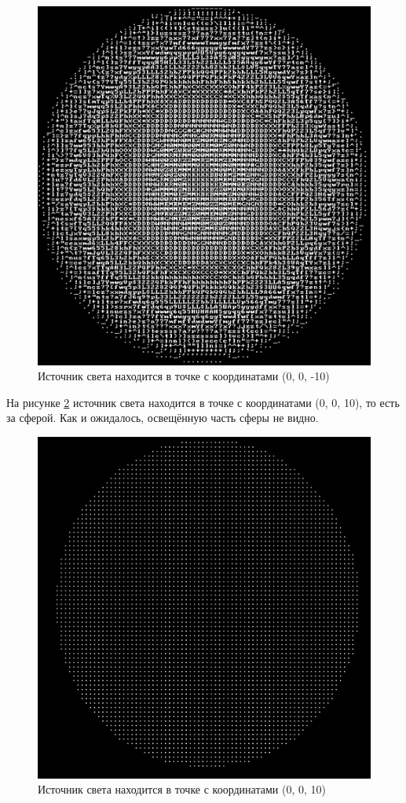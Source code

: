 \begin{figure}[H]
    \centering
    \includegraphics[scale=0.2]{images/test4.png}
    \caption{Источник света находится в точке с координатами (0, 0, -10)}
    \label{fig:test4}
\end{figure}

На рисунке \ref{fig:test5} источник света находится в точке с координатами (0, 0, 10), то есть за сферой. Как и ожидалось, освещённую часть сферы не видно.

\begin{figure}[H]
    \centering
    \includegraphics[scale=0.2]{images/test3.png}
    \caption{Источник света находится в точке с координатами (0, 0, 10)}
    \label{fig:test5}
\end{figure}

